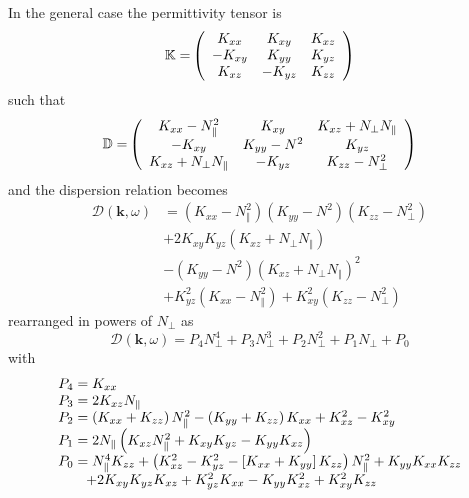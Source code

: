 \documentclass[a4paper,12pt]{article}%
\begin{document}
In the general case the permittivity tensor is%
\begin{equation}
\mathbb{K=}\left(
\begin{array}
[c]{ccc}%
K_{xx} & K_{xy} & K_{xz}\\
-K_{xy} & K_{yy} & K_{yz}\\
K_{xz} & -K_{yz} & K_{zz}%
\end{array}
\right)
\end{equation}
such that
\begin{equation}
\mathbb{D=}\left(
\begin{array}
[c]{ccc}%
K_{xx}-N_{\Vert}^{2} & K_{xy} & K_{xz}+N_{\bot}N_{\Vert}\\
-K_{xy} & K_{yy}-N^{2} & K_{yz}\\
K_{xz}+N_{\bot}N_{\Vert} & -K_{yz} & K_{zz}-N_{\bot}^{2}%
\end{array}
\right)
\end{equation}
and the dispersion relation becomes%
\begin{align}
\mathcal{D}\left(  \mathbf{k},\omega\right)   &  =\left(  K_{xx}-N_{\Vert}%
^{2}\right)  \left(  K_{yy}-N^{2}\right)  \left(  K_{zz}-N_{\bot}^{2}\right)
\\
&  +2K_{xy}K_{yz}\left(  K_{xz}+N_{\bot}N_{\Vert}\right) \nonumber\\
&  -\left(  K_{yy}-N^{2}\right)  \left(  K_{xz}+N_{\bot}N_{\Vert}\right)
^{2}\nonumber\\
&  +K_{yz}^{2}\left(  K_{xx}-N_{\Vert}^{2}\right)  +K_{xy}^{2}\left(
K_{zz}-N_{\bot}^{2}\right) \nonumber
\end{align}
rearranged in powers of $N_{\bot}$ as%
\begin{equation}
\mathcal{D}\left(  \mathbf{k},\omega\right)  =P_{4}N_{\bot}^{4}+P_{3}N_{\bot
}^{3}+P_{2}N_{\bot}^{2}+P_{1}N_{\bot}+P_{0}%
\end{equation}
with
\[%
\begin{array}
[c]{l}%
P_{4}=K_{xx}\\
P_{3}=2K_{xz}N_{\Vert}\\
P_{2}=\left(  K_{xx}+K_{zz}\right)  N_{\Vert}^{2}-\left(  K_{yy}%
+K_{zz}\right)  K_{xx}+K_{xz}^{2}-K_{xy}^{2}\\
P_{1}=2N_{\Vert}\left(  K_{xz}N_{\Vert}^{2}+K_{xy}K_{yz}-K_{yy}K_{xz}\right)
\\
P_{0}=N_{\Vert}^{4}K_{zz}+\left(  K_{xz}^{2}-K_{yz}^{2}-\left[  K_{xx}%
+K_{yy}\right]  K_{zz}\right)  N_{\Vert}^{2}+K_{yy}K_{xx}K_{zz}\\
\qquad+2K_{xy}K_{yz}K_{xz}+K_{yz}^{2}K_{xx}-K_{yy}K_{xz}^{2}+K_{xy}^{2}K_{zz}%
\end{array}
\]
\end{document}
